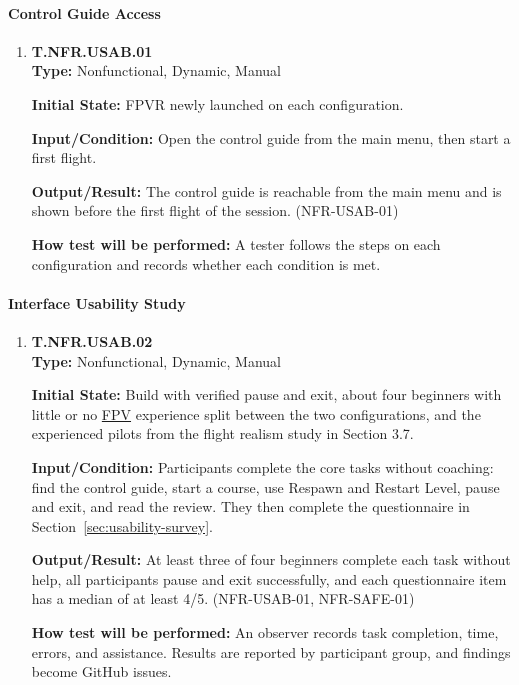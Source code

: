 \documentclass[12pt, titlepage]{article}
\begin{document}
{\sloppy
\paragraph{Control Guide Access}

\begin{enumerate}

\item{\hypertarget{test-nfr-usab-01}{}\textbf{T.NFR.USAB.01}\\}
\textbf{Type:} Nonfunctional, Dynamic, Manual

\textbf{Initial State:} FPVR newly launched on each configuration.

\textbf{Input/Condition:} Open the control guide from the main menu, then start a first
flight.

\textbf{Output/Result:} The control guide is reachable from the main menu and is shown
before the first flight of the session. (\mbox{NFR-USAB-01})

\textbf{How test will be performed:} A tester follows the steps on each configuration
and records whether each condition is met.

\end{enumerate}

\paragraph{Interface Usability Study}

\begin{enumerate}

\item{\hypertarget{test-nfr-usab-02}{}\textbf{T.NFR.USAB.02}\\}
\textbf{Type:} Nonfunctional, Dynamic, Manual

\textbf{Initial State:} Build with verified pause and exit, about four beginners with
little or no \hyperlink{abbr:FPV}{FPV} experience split between the two configurations, and the experienced
pilots from the flight realism study in Section 3.7.

\textbf{Input/Condition:} Participants complete the core tasks without coaching: find
the control guide, start a course, use Respawn and Restart Level, pause and exit, and
read the review. They then complete the questionnaire in
Section~\ref{sec:usability-survey}.

\textbf{Output/Result:} At least three of four beginners complete each task without
help, all participants pause and exit successfully, and each questionnaire item has a
median of at least 4/5. (\mbox{NFR-USAB-01}, \mbox{NFR-SAFE-01})

\textbf{How test will be performed:} An observer records task completion, time, errors,
and assistance. Results are reported by participant group, and findings become GitHub
issues.

\end{enumerate}
\par}
\end{document}
